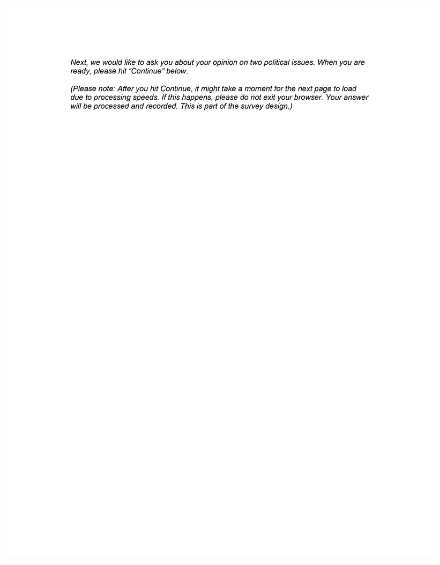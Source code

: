 \documentclass[12pt,econ]{sources/authesis}
\makeatletter
\def\maxwidth{\ifdim\Gin@nat@width>\linewidth\linewidth
\else\Gin@nat@width\fi}
\let\Oldincludegraphics\includegraphics
\renewcommand{\includegraphics}[1]{\Oldincludegraphics[width=\maxwidth]{#1}}
\makeatother
\begin{document}
\begin{figure}[hbt]
  \centering
\includegraphics{data/framing/appendix/questionnaire/questionnaire14.jpg}
\end{figure}
\end{document}
